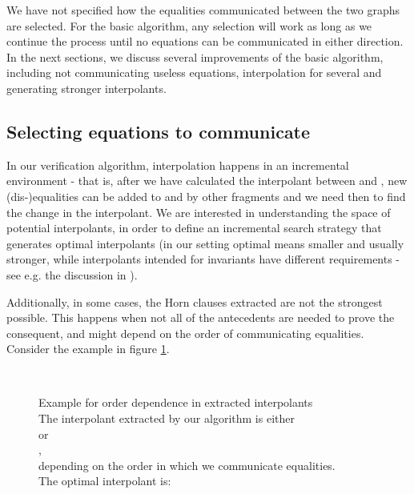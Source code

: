 We have not specified how the equalities communicated between the two graphs are selected.
For the basic algorithm, any selection will work as long as we continue the process until no equations can be communicated in either direction.
In the next sections, we discuss several improvements of the basic algorithm, 
including not communicating useless equations, interpolation for several  and generating stronger interpolants.




\subsection{Selecting equations to communicate}
In our verification algorithm, interpolation happens in an incremental environment - that is, after we have calculated the interpolant between  and , new (dis-)equalities can be added to  and  by other fragments and we need then to find the change in the interpolant.
We are interested in understanding the space of potential interpolants, in order to define an incremental search strategy that generates optimal interpolants 
(in our setting optimal means smaller and usually stronger, 
while interpolants intended for invariants have different requirements - see e.g. the discussion in \cite{DBLP:conf/vmcai/DSilvaKPW10}).

Additionally, in some cases, the Horn clauses extracted are not the strongest possible. 
This happens when not all of the antecedents are needed to prove the consequent, and might depend on the order of communicating equalities.\\
Consider the example in figure \ref{example_4.2.1.3}.

\begin{figure}
\\
\caption{Example for order dependence in extracted interpolants\\
The interpolant extracted by our algorithm is either \\
 or \\
,\\
depending on the order in which we communicate equalities.\\
The optimal interpolant is:\\
}
\label{example_4.2.1.3}
\end{figure}


